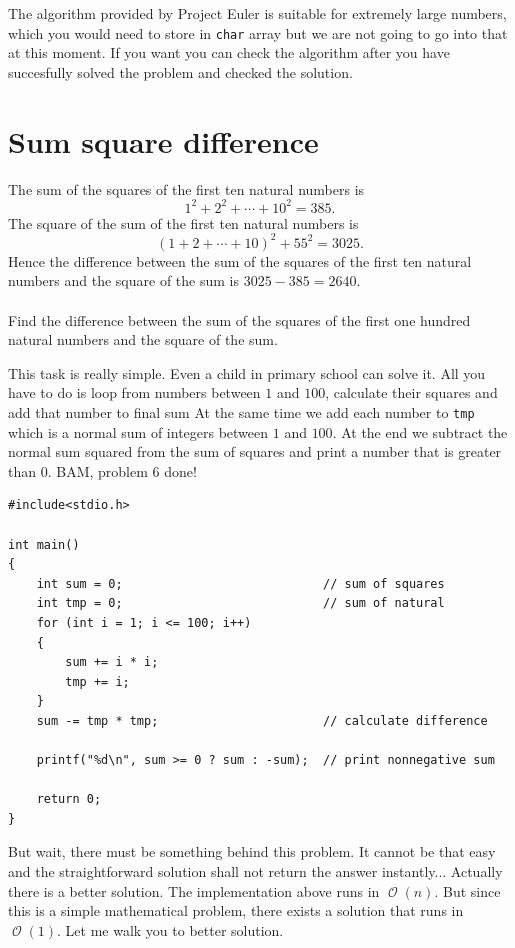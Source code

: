 \documentclass{book}
\DeclareMathOperator{\bigo}{\mathcal{O}}
\newenvironment{task}
  {\begin{mdframed}[backgroundcolor=lightgray]}
  {\end{mdframed}}
\begin{document}
The algorithm provided by Project Euler is suitable for extremely large numbers, which you would need to store in \texttt{char} array but we are not going to go into that at this moment. If you want you can check the algorithm after you have succesfully solved the problem and checked the solution.


\section{Sum square difference}

\begin{task}
The sum of the squares of the first ten natural numbers is \[1^2 + 2^2 + \dotsm + 10^2 = 385.\] The square of the sum of the first ten natural numbers is \[(1+2+ \dotsm + 10) ^2 + 55^2 = 3025.\] Hence the difference between the sum of the squares of the first ten natural numbers and the square of the sum is $3025 - 385 = 2640$.\\
\\
Find the difference between the sum of the squares of the first one hundred natural numbers and the square of the sum.
\end{task}

This task is really simple. Even a child in primary school can solve it. All you have to do is loop from numbers between $1$ and $100$, calculate their squares and add that number to final sum At the same time we add each number to \texttt{tmp} which is a normal sum of integers between $1$ and $100$. At the end we subtract the normal sum squared from the sum of squares and print a number that is greater than $0$. BAM, problem 6 done!

\begin{verbatim}
#include<stdio.h>

int main()
{
    int sum = 0;                            // sum of squares
    int tmp = 0;                            // sum of natural
    for (int i = 1; i <= 100; i++)
    {
        sum += i * i;
        tmp += i;
    }
    sum -= tmp * tmp;                       // calculate difference

    printf("%d\n", sum >= 0 ? sum : -sum);  // print nonnegative sum

    return 0;
}
\end{verbatim}

But wait, there must be something behind this problem. It cannot be that easy and the straightforward solution shall not return the answer instantly... Actually there is a better solution. The implementation above runs in $\bigo(n)$. But since this is a simple mathematical problem, there exists a solution that runs in $\bigo(1)$. Let me walk you to better solution.\\
\end{document}
